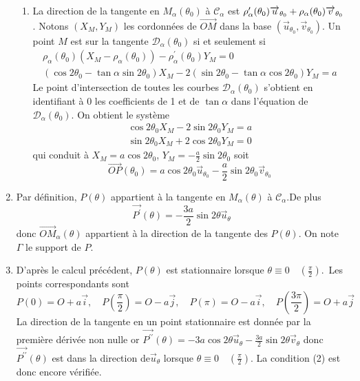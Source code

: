 \begin{enumerate}
\begin{enumerate}
\item  La direction de la tangente en $M_{\alpha }(\theta _{0})$ \`{a} $%
\mathcal{C}_{\alpha }$ est $\rho _{\alpha }^{\prime }(\theta _{0})%
\overrightarrow{u}_{\theta _{0}}+\rho _{\alpha }(\theta _{0})\overrightarrow{%
v}_{\theta _{0}}$. Notons $(X_{M},Y_{M})$ les cordonn\'{e}es de $%
\overrightarrow{OM}$ dans la base $(\overrightarrow{u}_{\theta _{0}},%
\overrightarrow{v}_{\theta _{0}})$. Un point $M$ est sur la tangente $%
\mathcal{D}_{\alpha }(\theta _{0})$ si et seulement si 
\begin{eqnarray*}
\rho _{\alpha }(\theta _{0})(X_{M}-\rho _{\alpha }(\theta _{0}))-\rho
_{\alpha }^{\prime }(\theta _{0})Y_{M}=0 \\
(\cos 2\theta _{0}-\tan \alpha \sin 2\theta _{0})X_{M}-2(\sin 2\theta
_{0}-\tan \alpha \cos 2\theta _{0})Y_{M}=a
\end{eqnarray*}
Le point d'intersection de toutes les courbes $\mathcal{D}_{\alpha }(\theta
_{0})$ s'obtient en identifiant \`{a} 0 les coefficients de 1 et de $\tan
\alpha $ dans l'\'{e}quation de $\mathcal{D}_{\alpha }(\theta _{0})$. On
obtient le syst\`{e}me 
\begin{eqnarray*}
\cos 2\theta _{0}X_{M}-2\sin 2\theta _{0}Y_{M}=a \\
\sin 2\theta _{0}X_{M}+2\cos 2\theta _{0}Y_{M}=0
\end{eqnarray*}
qui conduit \`{a} $X_{M}=a\cos 2\theta _{0}$, $Y_{M}=-\frac{a}{2}\sin
2\theta _{0}$ soit 
\[
\overrightarrow{OP}(\theta _{0})=a\cos 2\theta _{0}\overrightarrow{u}%
_{\theta _{0}}-\frac{a}{2}\sin 2\theta _{0}\overrightarrow{v}_{\theta _{0}} 
\]
\end{enumerate}

\item  Par d\'{e}finition, $P(\theta )$ appartient \`{a} la tangente en $%
M_{\alpha }(\theta )$ \`{a} $\mathcal{C}_{\alpha }$.De plus 
\[
\overrightarrow{P^{\prime }}(\theta )=-\frac{3a}{2}\sin 2\theta 
\overrightarrow{u}_{\theta } 
\]
donc $\overrightarrow{OM}_{\alpha }(\theta )$ appartient \`{a} la direction
de la tangente des $P(\theta )$. On note $\Gamma $ le support de $P$.

\item  D'apr\`{e}s le calcul pr\'{e}c\'{e}dent, $P(\theta )$ est
stationnaire lorsque $\theta \equiv 0\quad (\frac{\pi }{2})$.\ Les points
correspondants sont 
\[
P(0)=O+a\overrightarrow{i},\quad P(\frac{\pi }{2})=O-a\overrightarrow{j}%
,\quad P(\pi )=O-a\overrightarrow{i},\quad P(\frac{3\pi }{2})=O+a%
\overrightarrow{j}
\]
La direction de la tangente en un point stationnaire est donn\'{e}e par la
premi\`{e}re d\'{e}riv\'{e}e non nulle or $\overrightarrow{P^{\prime \prime }%
}(\theta )=-3a\cos 2\theta \overrightarrow{u}_{\theta }-\frac{3a}{2}\sin
2\theta \overrightarrow{v}_{\theta }$ donc $\overrightarrow{P^{\prime \prime
}}(\theta )$ est dans la direction de$\overrightarrow{u}_{\theta }$ lorsque $%
\theta \equiv 0\quad (\frac{\pi }{2})$. La condition (2) est donc encore
v\'{e}rifi\'{e}e$.$


\end{enumerate}
